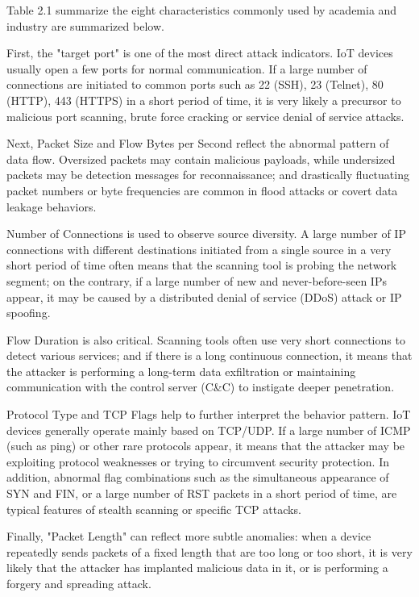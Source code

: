 \begin{ZhChapter}
    Table 2.1 summarize the eight characteristics commonly used by academia and industry are summarized below.

    First, the "target port" is one of the most direct attack indicators. IoT devices usually open a few ports for normal communication. If a large number of connections are initiated to common ports such as 22 (SSH), 23 (Telnet), 80 (HTTP), 443 (HTTPS) in a short period of time, it is very likely a precursor to malicious port scanning, brute force cracking or service denial of service attacks\cite{sicari2015}.

    Next, Packet Size and Flow Bytes per Second reflect the abnormal pattern of data flow. Oversized packets may contain malicious payloads, while undersized packets may be detection messages for reconnaissance; and drastically fluctuating packet numbers or byte frequencies are common in flood attacks or covert data leakage behaviors\cite{moustafa2015}.

    Number of Connections is used to observe source diversity. A large number of IP connections with different destinations initiated from a single source in a very short period of time often means that the scanning tool is probing the network segment; on the contrary, if a large number of new and never-before-seen IPs appear, it may be caused by a distributed denial of service (DDoS) attack or IP spoofing\cite{sicari2015}.

    Flow Duration is also critical. Scanning tools often use very short connections to detect various services; and if there is a long continuous connection, it means that the attacker is performing a long-term data exfiltration or maintaining communication with the control server (C\&C) to instigate deeper penetration\cite{moustafa2015}.

    Protocol Type and TCP Flags help to further interpret the behavior pattern. IoT devices generally operate mainly based on TCP/UDP. If a large number of ICMP (such as ping) or other rare protocols appear, it means that the attacker may be exploiting protocol weaknesses or trying to circumvent security protection. In addition, abnormal flag combinations such as the simultaneous appearance of SYN and FIN, or a large number of RST packets in a short period of time, are typical features of stealth scanning or specific TCP attacks\cite{moustafa2015}.

    Finally, "Packet Length" can reflect more subtle anomalies: when a device repeatedly sends packets of a fixed length that are too long or too short, it is very likely that the attacker has implanted malicious data in it, or is performing a forgery and spreading attack.


\end{ZhChapter}

